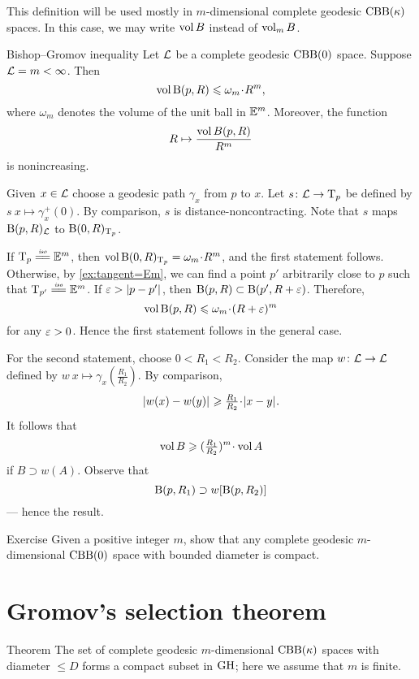 This definition will be used mostly in $m$-dimensional complete geodesic $\mathrm{CBB}(\kappa)$ spaces.
In this case, we may write $\operatorname{\rm vol}\nolimits B$ instead of $\operatorname{\rm vol}\nolimits_m B$.


\begin{thm}{Bishop--Gromov inequality}
Let $\mathcal{L}$ be a complete geodesic $\mathrm{CBB}(0)$ space.
Suppose $\mathcal{L}=m<\infty$.
Then 
\[\vol \oBall(p,R)\le \omega_m\cdot R^m,\]
where $\omega_m$ denotes the volume of the unit ball in $\mathbb{E}^m$.
Moreover, the function 
\[R\mapsto \frac{\operatorname{\rm vol}\nolimits B(p,R)}{R^m}\]
is nonincreasing.
\end{thm}

Given $x\in\mathcal{L}$ choose a geodesic path $\gamma_x$ from $p$ to $x$.
Let $s\colon\mathcal{L}\to \mathrm{T}_p$ be defined by $s\:x\mapsto \gamma_x^+(0)$.
By comparison, $s$ is distance-noncontracting.
Note that $s$ maps $\mathrm{B}{}(p,R)_{\mathcal{L}}$ to $\mathrm{B}{}(0,R)_{\mathrm{T}_p}$.

If $\T_p\iso \EE^m$, then $\vol\oBall(0,R)_{\T_p}=\omega_m\cdot R^m$,
and the first statement follows.
Otherwise, by \ref{ex:tangent=Em}, we can find a point $p'$ arbitrarily close to $p$ such that $\T_{p'}\iso \EE^m$.
If $\eps>\dist{p}{p'}{}$, then $\mathrm{B}{}(p,R)\subset \mathrm{B}{}(p',R+\varepsilon)$.
Therefore,
\[\vol \oBall(p,R)\le \omega_m\cdot (R+\eps)^m\]
for any $\varepsilon>0$.
Hence the first statement follows in the general case.

For the second statement, choose $0<R_1<R_2$.
Consider the map $w\colon \mathcal{L}\to \mathcal{L}$ defined by $w\:x\mapsto \gamma_x(\tfrac {R_1}{R_2})$.
By comparison,
\[\dist{w(x)}{w(y)}{}\ge \tfrac {R_1}{R_2}\cdot \dist{x}{y}{}.\]
It follows that 
\[\vol B\ge (\tfrac {R_1}{R_2})^m\cdot\vol A\]
if $B\supset w(A)$.
Observe that 
\[\mathrm{B}{}(p,R_1) \supset w[\mathrm{B}{}(p,R_2)]\]
--- hence the result.
\qeds

\begin{thm}{Exercise}\label{ex:diam-compact}
Given a positive integer $m$, 
show that any complete geodesic $m$-dimensional $\mathrm{CBB}(0)$ space with bounded diameter is compact.
\end{thm}

\section{Gromov's selection theorem}

\begin{thm}{Theorem}\label{thm:gromov-compactness}
The set of complete geodesic $m$-dimensional $\mathrm{CBB}(\kappa)$ spaces with diameter $\le D$ forms a compact subset in $\operatorname{\rm GH}\nolimits$;
here we assume that $m$ is finite.
\end{thm}

